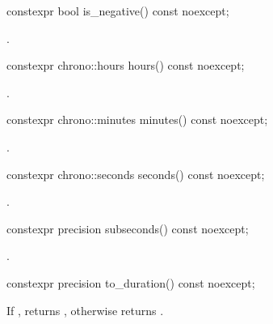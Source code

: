 %
\begin{itemdecl}
constexpr bool is_negative() const noexcept;
\end{itemdecl}

\begin{itemdescr}
\pnum
\returns
{}.
\end{itemdescr}

%
\begin{itemdecl}
constexpr chrono::hours hours() const noexcept;
\end{itemdecl}

\begin{itemdescr}
\pnum
\returns
{}.
\end{itemdescr}

%
\begin{itemdecl}
constexpr chrono::minutes minutes() const noexcept;
\end{itemdecl}

\begin{itemdescr}
\pnum
\returns
{}.
\end{itemdescr}

%
\begin{itemdecl}
constexpr chrono::seconds seconds() const noexcept;
\end{itemdecl}

\begin{itemdescr}
\pnum
\returns
{}.
\end{itemdescr}

%
\begin{itemdecl}
constexpr precision subseconds() const noexcept;
\end{itemdecl}

\begin{itemdescr}
\pnum
\returns
{}.
\end{itemdescr}

%
\begin{itemdecl}
constexpr precision to_duration() const noexcept;
\end{itemdecl}

\begin{itemdescr}
\pnum
\returns
If , returns ,
otherwise returns .
\end{itemdescr}

